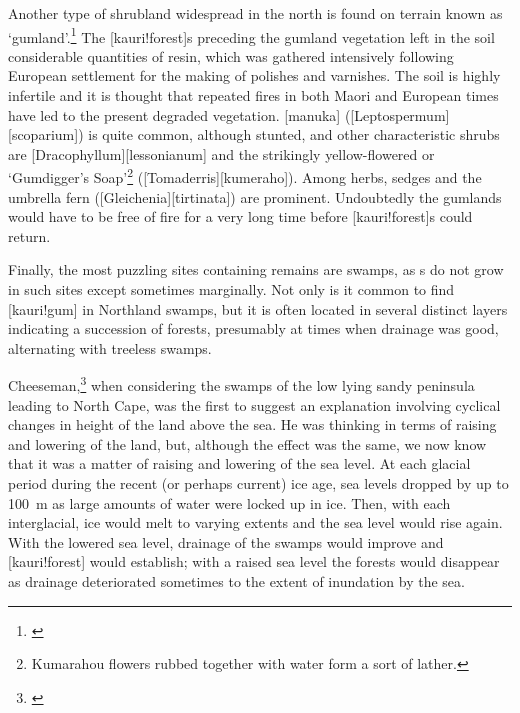 Another type of shrubland widespread in the north is found on terrain known as `gumland'.\footnote{\cite{esler1975gumland}}
The [kauri!forest]s preceding the gumland vegetation left in the soil considerable quantities of resin, which was gathered intensively following European settlement for the making of polishes and varnishes.
The soil is highly infertile and it is thought that repeated fires in both Maori and European times have led to the present degraded vegetation.
[manuka] ([Leptospermum][scoparium]) is quite common, although stunted, and other characteristic shrubs are [Dracophyllum][lessonianum] and the strikingly yellow-flowered  or `Gumdigger's Soap'\footnote{Kumarahou flowers rubbed together with water form a sort of lather.} ([Tomaderris][kumeraho]).
Among herbs, sedges and the umbrella fern ([Gleichenia][tirtinata]) are prominent.
Undoubtedly the gumlands would have to be free of fire for a very long time before [kauri!forest]s could return.

Finally, the most puzzling sites containing  remains are swamps, as s do not grow in such sites except sometimes marginally.
Not only is it common to find [kauri!gum] in Northland swamps, but it is often located in several distinct layers indicating a succession of forests, presumably at times when drainage was good, alternating with treeless swamps.

Cheeseman,\footnote{\cite{cheeseman1896flora}} when considering the swamps of the low lying sandy peninsula leading to North Cape, was the first to suggest an explanation involving cyclical changes in height of the land above the sea.
He was thinking in terms of raising and lowering of the land, but, although the effect was the same, we now know that it was a matter of raising and lowering of the sea level.
At each glacial period during the recent (or perhaps current) ice age, sea levels dropped by up to \SI{100}{\metre} as large amounts of water were locked up in ice.
Then, with each interglacial, ice would melt to varying extents and the sea level would rise again.
With the lowered sea level, drainage of the swamps would improve and [kauri!forest] would establish; with a raised sea level the forests would disappear as drainage deteriorated sometimes to the extent of inundation by the sea.

